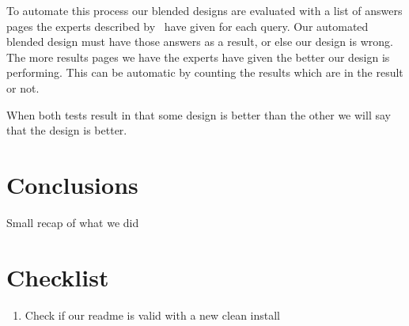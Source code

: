 \documentclass[12pt]{article}
\begin{document}
To automate this process our blended designs are evaluated with a list of answers pages the experts described by~\cite{lalmas2011aggregated} have given for each query. Our automated blended design must have those answers as a result, or else our design is wrong. The more results pages we have the experts have given the better our design is performing. This can be automatic by counting the results which are in the result or not. 

When both tests result in that some design is better than the other we will say that the design is better. %

\section{Conclusions}
Small recap of what we did

\section{Checklist}
\begin{enumerate}
\item Check if our readme is valid with a new clean install
\end{enumerate}



\end{document}
